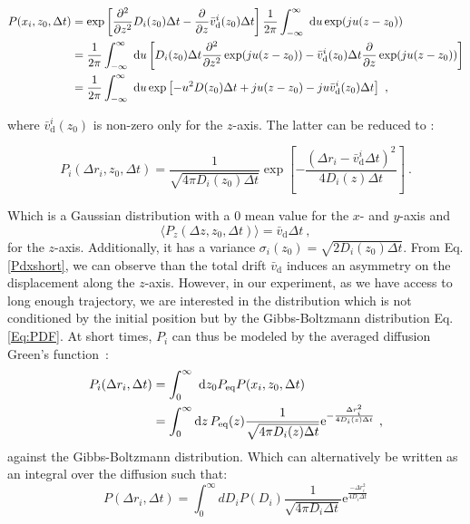 \begin{equation}
	\begin{aligned}
		P(x_i, z_0, \Delta t) &= \exp \left[  \frac{\partial ^2}{\partial z ^2} D_i(z_0) \Delta t - \frac{\partial}{\partial z} \bar{v}^i _\mathrm{d} (z_0) \Delta t \right] \frac{1}{2 \pi} \int _{-\infty} ^{\infty} ~ \textnormal{d}u \exp (ju(z-z_0))  \\
		&= \frac{1}{2\pi} \int _{-\infty} ^{\infty} ~ \textnormal{d}u  \left[ D_i(z_0) \Delta t \frac{\partial ^2}{\partial z ^2} \exp (ju(z-z_0)) -  \bar{v}^i _\mathrm{d} (z_0) \Delta t \frac{\partial}{\partial z} \exp (ju(z-z_0)) \right] \\
		& = \frac{1}{2\pi} \int_{-\infty}^{\infty} ~ \textnormal{d}u \exp \left[ -u^2 D(z_0)\Delta t + ju(z-z_0) - ju  \bar{v}^i _\mathrm{d} (z_0) \Delta t \right] ~,
	\end{aligned}
\end{equation}

where $ \bar{v}^i _\mathrm{d} (z_0)$ is non-zero only for the $z$-axis. The latter can be reduced to \cite{matse_state-dependent_nodate, risken_fokker-planck_2012}:

\begin{equation}
	P_i(\Delta r_i, z_0, \Delta t) =   \frac{1}{\sqrt{4 \pi D_i(z_0) \Delta t}} \exp \left[-\frac{(\Delta r_i - \bar{v}^i_\mathrm{d}\Delta t)^2}{4 D_i(z) \Delta t}   \right]\ .
	\label{Pdxshort}
\end{equation}

Which is a Gaussian distribution with a 0 mean value for the $x$- and $y$-axis and  
\begin{equation}
	\langle P_z(\Delta z, z_0, \Delta t) \rangle = \bar{v}_\mathrm{d} \Delta t ~,
\end{equation}
for the $z$-axis. Additionally, it has a variance $\sigma_i(z_0) = \sqrt{2D_i (z_0) \Delta t}$. From Eq.\ref{Pdxshort}, we can observe than the total drift $\bar{v}_\mathrm{d}$ induces an asymmetry on the displacement along the $z$-axis. However, in our experiment, as we have access to long enough trajectory, we are interested in the distribution which is not conditioned by the initial position but by the Gibbs-Boltzmann distribution Eq.\ref{Eq:PDF}. At short times, $P_i$ can thus be modeled by the averaged diffusion Green's function~\cite{matse_test_2017,hapca_anomalous_2009}:
\begin{equation}
	\begin{aligned}
		P_i(\Delta r_i, \Delta t) & = \int _{0} ^\infty ~\textnormal{d} z_0 P_\mathrm{eq}  P(x_i, z_0, \Delta t) \\
		&= \int ^\infty _0 \mathrm{d}z\, P_{\textrm{eq}}(z) \frac{1}{\sqrt{4 \pi D_i(z) \Delta t}} \textrm{e}^{-\frac{\Delta r_i^2}{4 D_i(z) \Delta t}     }\ ,
	\end{aligned}
	\label{Eq:PDzshort}
\end{equation}
against the Gibbs-Boltzmann distribution. Which can alternatively be written as an integral over the diffusion such that:
\begin{equation}
	P(\Delta r_i , \Delta t) = \int_0 ^\infty dD_iP(D_i) \frac{1}{\sqrt{4 \pi D_i \Delta t}} \mathrm{e} ^{\frac{-\Delta r_i ^2}{4D_i\Delta t}} 
\end{equation}

